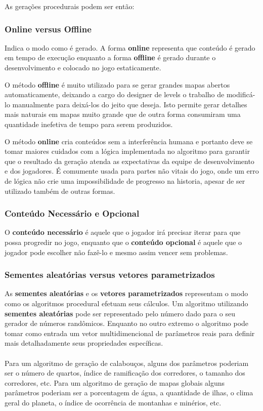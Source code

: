 	As gerações procedurais podem ser então:
	
	\subsubsection*{Online versus Offline}
		Indica o modo como é gerado. A forma \textbf{online} representa que conteúdo é gerado em tempo de execução enquanto a forma \textbf{offline} é gerado durante o desenvolvimento e colocado no jogo estaticamente. 
		
		O método \textbf{offline} é muito utilizado para se gerar grandes mapas abertos automaticamente, deixando a cargo do designer de levels o trabalho de modificá-lo manualmente para deixá-los do jeito que deseja. Isto permite gerar detalhes mais naturais em mapas muito grande que de outra forma consumiram uma quantidade inefetiva de tempo para serem produzidos.
		
		O método \textbf{online} cria conteúdos sem a interferência humana e portanto deve se tomar maiores cuidados com a lógica implementada no algoritmo para garantir que o resultado da geração atenda as expectativas da equipe de desenvolvimento e dos jogadores. É comumente usada para partes não vitais do jogo, onde um erro de lógica não crie uma impossibilidade de progresso na historia, apesar de ser utilizado também de outras formas.
		
\subsubsection*{Conteúdo Necessário e Opcional}
		O \textbf{conteúdo necessário} é aquele que o jogador irá precisar iterar para que possa progredir no jogo, enquanto que o \textbf{conteúdo opcional} é aquele que o jogador pode escolher não fazê-lo e mesmo assim vencer 
		sem problemas.
	\subsubsection*{Sementes aleatórias versus vetores parametrizados}
		As \textbf{sementes aleatórias} e os \textbf{vetores parametrizados} representam o modo como os algoritmos procedural efetuam seus cálculos. Um algoritmo utilizando 		
		\textbf{sementes aleatórias} pode ser representado pelo número dado para o seu gerador de números randômicos. 
		Enquanto no outro extremo o algoritmo pode tomar como entrada um vetor multidimencional de parâmetros 
		reais para definir mais detalhadamente seus propriedades específicas. 
		\\ \\Para um algoritmo de geração de calabouços, alguns dos parâmetros poderiam ser o número de 
		quartos, índice de ramificação dos corredores, o tamanho dos corredores, etc. Para um algoritmo de geração de mapas globais alguns parâmetros poderiam ser a porcentagem de água, a quantidade de ilhas, o clima geral do planeta, o índice de ocorrência de montanhas e minérios, etc.
